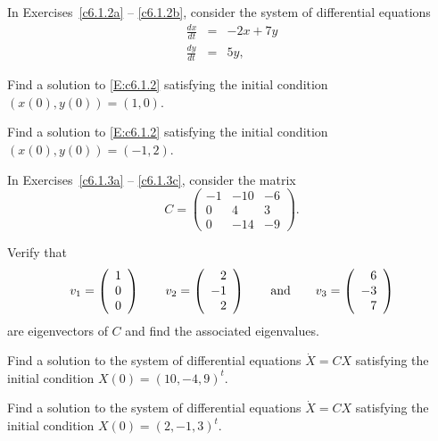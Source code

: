 \documentclass{ximera}
\begin{document}
\noindent In Exercises~\ref{c6.1.2a} -- \ref{c6.1.2b}, consider the system of
differential equations
\begin{equation}  \label{E:c6.1.2}
\begin{array}{rcl}
\frac{dx}{dt} & = & -2x+7y \\
\frac{dy}{dt} & = &  5y,
\end{array}
\end{equation}
\begin{exercise} \label{c6.1.2a}
Find a solution to \eqref{E:c6.1.2}
satisfying the initial condition $(x(0),y(0)) = (1,0)$.
\end{exercise}
\begin{exercise} \label{c6.1.2b}
Find a solution to \eqref{E:c6.1.2}
satisfying the initial condition $(x(0),y(0)) = (-1,2)$.
\end{exercise}

\noindent In Exercises~\ref{c6.1.3a} -- \ref{c6.1.3c}, consider the matrix
\[
C = \left(\begin{array}{rrr} -1 & -10 & -6\\  0 & 4  & 3 \\  0  & -14  & -9
	\end{array}\right).
\]
\begin{exercise} \label{c6.1.3a}
Verify that
\[
v_1 = \left(\begin{array}{r} 1 \\ 0\\ 0\end{array}\right) \qquad
v_2 = \left(\begin{array}{r} 2 \\ -1\\ 2\end{array}\right) \quad \quad\mbox{and}\quad \quad
v_3 = \left(\begin{array}{r} 6 \\ -3\\ 7\end{array}\right)
\]
are eigenvectors of $C$ and find the associated eigenvalues.
\end{exercise}
\begin{exercise} \label{c6.1.3b}
Find a solution to the system of differential equations
$\dot{X}=CX$ satisfying the initial condition $X(0)= (10, -4, 9)^t$.
\end{exercise}
\begin{exercise} \label{c6.1.3c}
Find a solution to the system of differential equations
$\dot{X}=CX$ satisfying the initial condition $X(0)= ( 2, -1, 3)^t$.
\end{exercise}
\end{document}
